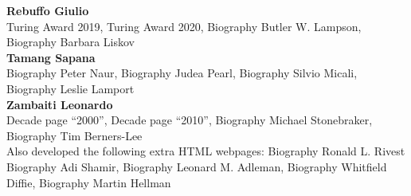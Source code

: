 \documentclass[11pt]{article}
\begin{document}
\noindent\textbf{Rebuffo Giulio}\\
Turing Award 2019, Turing Award 2020, Biography Butler W. Lampson, Biography Barbara Liskov\\

\noindent\textbf{Tamang Sapana}\\
Biography Peter Naur, Biography Judea Pearl, Biography Silvio Micali, Biography Leslie Lamport\\

\noindent\textbf{Zambaiti Leonardo}\\
Decade page ``2000'', Decade page ``2010'', Biography Michael Stonebraker, Biography Tim Berners-Lee\\
Also developed the following extra HTML webpages: Biography Ronald L. Rivest
Biography Adi Shamir, Biography Leonard M. Adleman, Biography Whitfield Diffie, Biography Martin Hellman
\end{document}
